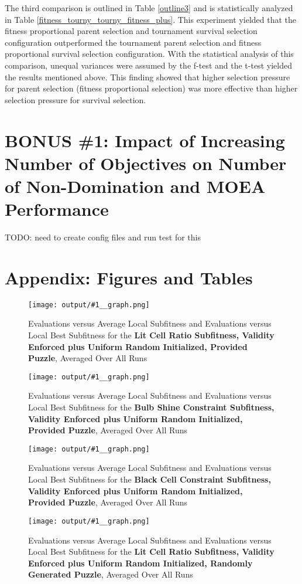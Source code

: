 \documentclass[11pt]{article}
\newcommand{\fitnessplotcaption}[1]{\caption{Evaluations versus Average Local Subfitness and Evaluations versus 
    Local Best Subfitness for the \textbf{{#1}}, Averaged Over All Runs}}
\newcommand{\addgraphic}[1]{\centerline{\texttt{[image: output/\#1\_\_graph.png]}}}
\begin{document}
The third comparison is outlined in Table \ref{outline3} and is statistically analyzed in Table
\ref{fitness_tourny_tourny_fitness_plus}. This experiment yielded that the fitness proportional 
parent selection and tournament survival selection configuration outperformed the 
tournament parent selection and fitness proportional survival selection configuration. With 
the statistical analysis of this comparison, unequal variances were assumed by the f-test and the
t-test yielded the results mentioned above. This finding showed that higher selection pressure
for parent selection (fitness proportional selection) was more effective than higher selection
pressure for survival selection.


\section{BONUS \#1: Impact of Increasing Number of Objectives on Number of Non-Domination and MOEA Performance}

TODO: need to create config files and run test for this


\section{Appendix: Figures and Tables}



\begin{figure}
    \addgraphic{website_puzzle/website_puzzle_lit_cell_ratio}
    \fitnessplotcaption{Lit Cell Ratio Subfitness, Validity Enforced plus Uniform Random Initialized, Provided Puzzle}
    \label{fig:website_v_ratio}
\end{figure}

\begin{figure}
    \addgraphic{website_puzzle/website_puzzle_bulb_shine_constr}
    \fitnessplotcaption{Bulb Shine Constraint Subfitness, Validity Enforced plus Uniform Random Initialized, Provided Puzzle}
    \label{fig:website_v_shine}
\end{figure}

\begin{figure}
    \addgraphic{website_puzzle/website_puzzle_black_cell_constr}
    \fitnessplotcaption{Black Cell Constraint Subfitness, Validity Enforced plus Uniform Random Initialized, Provided Puzzle}
    \label{fig:website_v_black}
\end{figure}

\begin{figure}
    \addgraphic{random_gen/random_gen_lit_cell_ratio}
    \fitnessplotcaption{Lit Cell Ratio Subfitness, Validity Enforced plus Uniform Random Initialized, Randomly Generated Puzzle}
    \label{fig:random_gen_v_ratio}
\end{figure}
\end{document}
